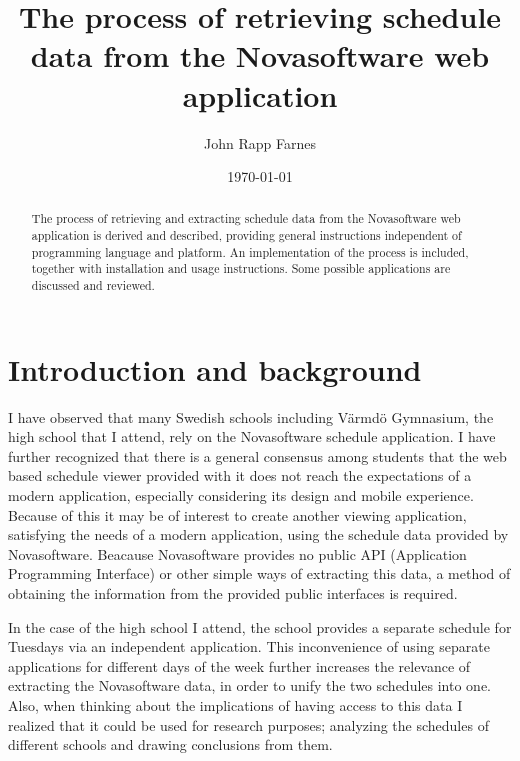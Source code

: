 \documentclass{article}
\begin{document}
	\title{The process of retrieving schedule data from the Novasoftware web application}
	
	\author{John Rapp Farnes}
	
	\date{\today}
	
	\maketitle
	
	\begin{abstract}\noindent
		The process of retrieving and extracting schedule data from the Novasoftware web application is derived and described, providing general instructions independent of programming language and platform. %
		An implementation of the process is included, together with installation and usage instructions. Some possible applications are discussed and reviewed.
	\end{abstract}
	
	\newpage
	
	\tableofcontents
	
	\cleardoublepage
	\pagestyle{plain}
	
	\section{Introduction and background}
	I have observed that many Swedish schools including Värmdö Gymnasium, the high school that I attend, rely on the Novasoftware schedule application. I have further recognized that there is a general consensus among students that the web based schedule viewer provided with it does not reach the expectations of a modern application, especially considering its design and mobile experience. Because of this it may be of interest to create another viewing application, satisfying the needs of a modern application, using the schedule data provided by Novasoftware. Beacause Novasoftware provides no public API (Application Programming Interface) or other simple ways of extracting this data, a method of obtaining the information from the provided public interfaces is required.
	
	In the case of the high school I attend, the school provides a separate schedule for Tuesdays via an independent application. This inconvenience of using separate applications for different days of the week further increases the relevance of extracting the Novasoftware data, in order to unify the two schedules into one. Also, when thinking about the implications of having access to this data I realized that it could be used for research purposes; analyzing the schedules of different schools and drawing conclusions from them.
	
\end{document}
